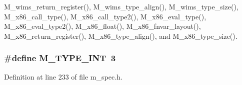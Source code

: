 M\_\-wims\_\-return\_\-register(), M\_\-wims\_\-type\_\-align(), M\_\-wims\_\-type\_\-size(), M\_\-x86\_\-call\_\-type(), M\_\-x86\_\-call\_\-type2(), M\_\-x86\_\-eval\_\-type(), M\_\-x86\_\-eval\_\-type2(), M\_\-x86\_\-float(), M\_\-x86\_\-fnvar\_\-layout(), M\_\-x86\_\-return\_\-register(), M\_\-x86\_\-type\_\-align(), and M\_\-x86\_\-type\_\-size().
\subsubsection{\setlength{\rightskip}{0pt plus 5cm}\#define M\_\-TYPE\_\-INT~3}\label{m__spec_8h_81e103e8a963b10031b293480d33c88b}




Definition at line 233 of file m\_\-spec.h.

